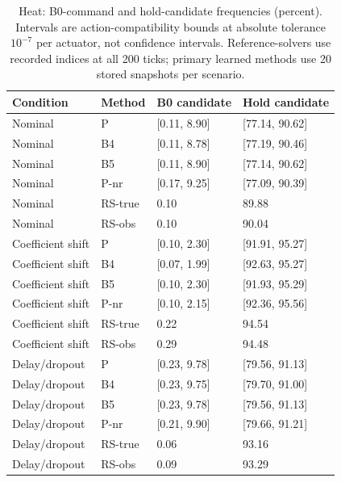 \begin{table}[ht]
\caption{Heat: B0-command and hold-candidate frequencies (percent). Intervals are action-compatibility bounds at absolute tolerance $10^{-7}$ per actuator, not confidence intervals. Reference-solvers use recorded indices at all 200 ticks; primary learned methods use 20 stored snapshots per scenario.}\label{tab:choices_heat}
\centering\small
\begin{tabular}{@{}llll@{}}\toprule
Condition & Method & B0 candidate & Hold candidate\\\midrule
Nominal & P & [0.11, 8.90] & [77.14, 90.62] \\
Nominal & B4 & [0.11, 8.78] & [77.19, 90.46] \\
Nominal & B5 & [0.11, 8.90] & [77.14, 90.62] \\
Nominal & P-nr & [0.17, 9.25] & [77.09, 90.39] \\
Nominal & RS-true & 0.10 & 89.88 \\
Nominal & RS-obs & 0.10 & 90.04 \\
Coefficient shift & P & [0.10, 2.30] & [91.91, 95.27] \\
Coefficient shift & B4 & [0.07, 1.99] & [92.63, 95.27] \\
Coefficient shift & B5 & [0.10, 2.30] & [91.93, 95.29] \\
Coefficient shift & P-nr & [0.10, 2.15] & [92.36, 95.56] \\
Coefficient shift & RS-true & 0.22 & 94.54 \\
Coefficient shift & RS-obs & 0.29 & 94.48 \\
Delay/dropout & P & [0.23, 9.78] & [79.56, 91.13] \\
Delay/dropout & B4 & [0.23, 9.75] & [79.70, 91.00] \\
Delay/dropout & B5 & [0.23, 9.78] & [79.56, 91.13] \\
Delay/dropout & P-nr & [0.21, 9.90] & [79.66, 91.21] \\
Delay/dropout & RS-true & 0.06 & 93.16 \\
Delay/dropout & RS-obs & 0.09 & 93.29 \\
\bottomrule\end{tabular}
\end{table}
